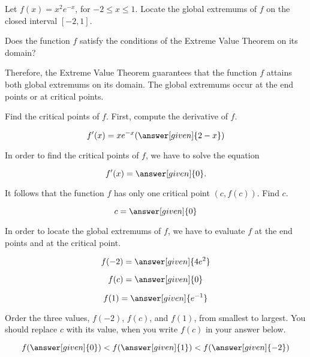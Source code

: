 \documentclass{ximera}
\begin{document}
\begin{question}
\author{Nela Lakos}

Let $f(x)=x^2e^{-x}$,  for $ -2\le x\le1$. Locate the global extremums of $f$ on the closed interval $[-2,1]$.


Does the function $f$ satisfy the conditions of the Extreme Value Theorem on its domain?
 \begin{multipleChoice}
  \end{multipleChoice}
  Therefore, the Extreme Value Theorem guarantees that the function $f$ attains both global extremums on its domain. The global extremums occur at the end points or at  critical points.
  
  Find the critical points of $f$. First, compute the derivative of $f$.
      \begin{prompt}
  \[
 f'(x)= xe^{-x}(\answer[given]{2-x})
  \]
  \end{prompt}
 In order to find the critical points of $f$, we have to solve the equation
 \begin{prompt}
 \[
 f'(x)= \answer[given]{0}.
  \]
  \end{prompt}
It follows that the  function $f$ has only one critical point $\left(c,f(c)\right)$. Find $c$.

  \begin{prompt}
  \[
c= \answer[given]{0}
  \]
  \end{prompt}
In order to locate the global extremums of $f$, we have to evaluate $f$ at the end points and at the critical point.
 \begin{prompt}
  \[
f(-2)= \answer[given]{4e^{2}}
  \]
  \end{prompt}
   \begin{prompt}
  \[
f(c)= \answer[given]{0}
  \]
  \end{prompt}
  
  \begin{prompt}
  \[
f(1)= \answer[given]{e^{-1}}
  \]
  \end{prompt}
   Order the three values, $f(-2)$, $f(c)$, and $f(1)$,  from smallest to largest. You should replace $c$ with its value, when you write $f(c)$  in your answer below.
   \begin{prompt}
  \[
f(\answer[given]{0})<f(\answer[given]{1})<f(\answer[given]{-2})
  \]


\end{prompt}
\end{question}
\end{document}
